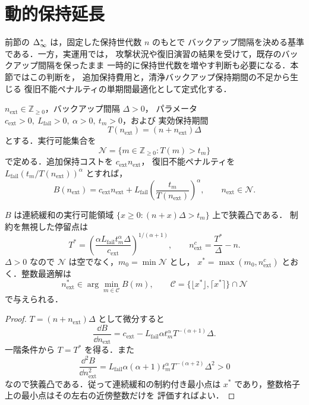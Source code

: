 \section{動的保持延長}

前節の $\Delta_\infty^\ast$ は，固定した保持世代数 $n$ のもとで
バックアップ間隔を決める基準である．一方，実運用では，
攻撃状況や復旧演習の結果を受けて，既存のバックアップ間隔を保ったまま
一時的に保持世代数を増やす判断も必要になる．本節ではこの判断を，
追加保持費用と，清浄バックアップ保持期間の不足から生じる
復旧不能ペナルティの単期間最適化として定式化する．

\begin{definition}[追加保持コスト関数]
$n_{\mathrm{ext}}\in\mathbb{Z}_{\ge0}$，バックアップ間隔 $\Delta>0$，
パラメータ $c_{\mathrm{ext}}>0,\ L_{\mathrm{fail}}>0,\ \alpha>0,\ t_m>0$，および
実効保持期間
\[
  T(n_{\mathrm{ext}})=(n+n_{\mathrm{ext}})\Delta
\]
とする．実行可能集合を
\[
  \mathcal{N}=\{m\in\mathbb{Z}_{\ge0}:T(m)>t_m\}
\]
で定める．追加保持コストを $c_{\mathrm{ext}} n_{\mathrm{ext}}$，
復旧不能ペナルティを
$L_{\mathrm{fail}}(t_m/T(n_{\mathrm{ext}}))^\alpha$ とすれば，
\[
  B(n_{\mathrm{ext}})
  =c_{\mathrm{ext}} n_{\mathrm{ext}}
  +L_{\mathrm{fail}}\left(\frac{t_m}{T(n_{\mathrm{ext}})}\right)^\alpha ,
  \qquad n_{\mathrm{ext}}\in\mathcal{N}.
\]
\end{definition}

\begin{proposition}[最適追加保持世代数]
$B$ は連続緩和の実行可能領域
$\{x\ge0:(n+x)\Delta>t_m\}$ 上で狭義凸である．
制約を無視した停留点は
\[
  T^\ast=\left(\frac{\alpha L_{\mathrm{fail}}t_m^\alpha\Delta}{c_{\mathrm{ext}}}
  \right)^{1/(\alpha+1)},\qquad
  n_{\mathrm{ext}}^c=\frac{T^\ast}{\Delta}-n .
\]
$\Delta>0$ なので $\mathcal{N}$ は空でなく，$m_0=\min\mathcal{N}$ とし，
$x^\ast=\max(m_0,n_{\mathrm{ext}}^c)$ とおく．整数最適解は
\[
  n_{\mathrm{ext}}^\ast
  \in\arg\min_{m\in\mathcal{C}} B(m),\qquad
  \mathcal{C}=\{\lfloor x^\ast\rfloor,\lceil x^\ast\rceil\}\cap\mathcal{N}
\]
で与えられる．
\end{proposition}

\begin{proof}
$T=(n+n_{\mathrm{ext}})\Delta$ として微分すると
\[
  \frac{\dd B}{\dd n_{\mathrm{ext}}}
  =c_{\mathrm{ext}}-L_{\mathrm{fail}}\alpha t_m^\alpha T^{-(\alpha+1)}\Delta .
\]
一階条件から $T=T^\ast$ を得る．また
\[
  \frac{\dd^2 B}{\dd n_{\mathrm{ext}}^2}
  =L_{\mathrm{fail}}\alpha(\alpha+1)t_m^\alpha T^{-(\alpha+2)}\Delta^2>0
\]
なので狭義凸である．従って連続緩和の制約付き最小点は
$x^\ast$ であり，整数格子上の最小点はその左右の近傍整数だけを
評価すればよい．
\end{proof}
